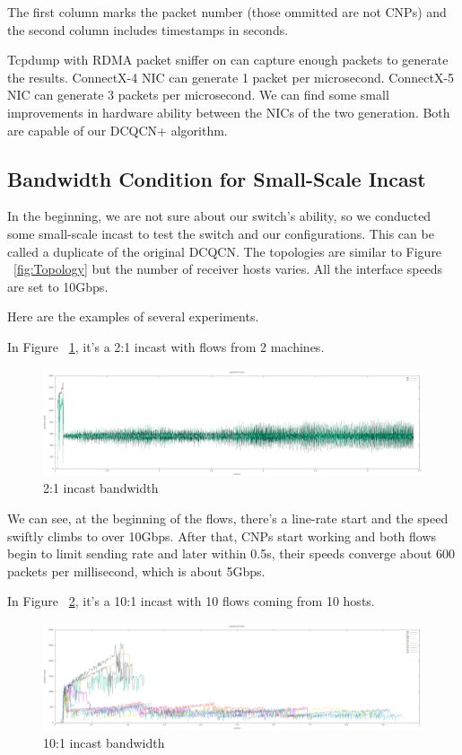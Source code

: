 \documentclass[12pt,a4paper]{article}
\begin{document}
The first column marks the packet number (those ommitted are not CNPs) and the second column includes timestamps in seconds.

Tcpdump with RDMA packet sniffer on can capture enough packets to generate the results.
ConnectX-4 NIC can generate 1 packet per microsecond.
ConnectX-5 NIC can generate 3 packets per microsecond.
We can find some small improvements in hardware ability between the NICs of the two generation.
Both are capable of our DCQCN+ algorithm.

\subsection{Bandwidth Condition for Small-Scale Incast}
In the beginning, we are not sure about our switch's ability, so we conducted some small-scale incast to test the switch and our configurations.
This can be called a duplicate of the original DCQCN.
The topologies are similar to Figure ~\ref{fig:Topology} but the number of receiver hosts varies.
All the interface speeds are set to 10Gbps.

Here are the examples of several experiments.

In Figure ~\ref{fig:2on1_1}, it's a 2:1 incast with flows from 2 machines.

\begin{figure}[h!]
	\begin{center}
		\includegraphics[width=6in]{2on1_1}
		\caption{2:1 incast bandwidth}
		\label{fig:2on1_1}
	\end{center}
\end{figure}

We can see, at the beginning of the flows, there's a line-rate start and the speed swiftly climbs to over 10Gbps.
After that, CNPs start working and both flows begin to limit sending rate and later within 0.5s, their speeds converge about
600 packets per millisecond, which is about 5Gbps.

In Figure ~\ref{fig:10on1_1}, it's a 10:1 incast with 10 flows coming from 10 hosts.

\begin{figure}[h!]
	\begin{center}
		\includegraphics[width=6in]{10on1_1}
		\caption{10:1 incast bandwidth}
		\label{fig:10on1_1}
	\end{center}
\end{figure}
\end{document}
